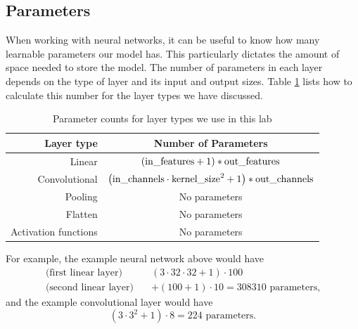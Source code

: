 \subsection*{Parameters}

When working with neural networks, it can be useful to know how many learnable parameters our model has.
This particularly dictates the amount of space needed to store the model.
The number of parameters in each layer depends on the type of layer and its input and output sizes.
Table \ref{table:param_cts} lists how to calculate this number for the layer types we have discussed.

\begin{table}
	\centering
	\begin{tabular}{r|c}
	Layer type & Number of Parameters \\
	\hline
	Linear & \((\lieq{in_features}+1)*\lieq{out_features}\) \\
	Convolutional & \(\left(\lieq{in_channels}\cdot \lieq{kernel_size}^2 + 1\right)*\lieq{out_channels}\) \\
	Pooling & No parameters \\
	Flatten & No parameters \\
	Activation functions & No parameters \\
	\end{tabular}
	\caption{Parameter counts for layer types we use in this lab}
	\label{table:param_cts}
\end{table}

For example, the example neural network above would have
\begin{align*}
\text{(first linear layer)}\quad\quad&
(3\cdot32\cdot 32+1)\cdot100 
\\
\text{(second linear layer)}\quad&
+(100+1)\cdot10 = 308310 \text{ parameters,}
\end{align*}
and the example convolutional layer would have
\[
(3\cdot 3^2+1)\cdot 8 = 224 \text{ parameters.}
\]

